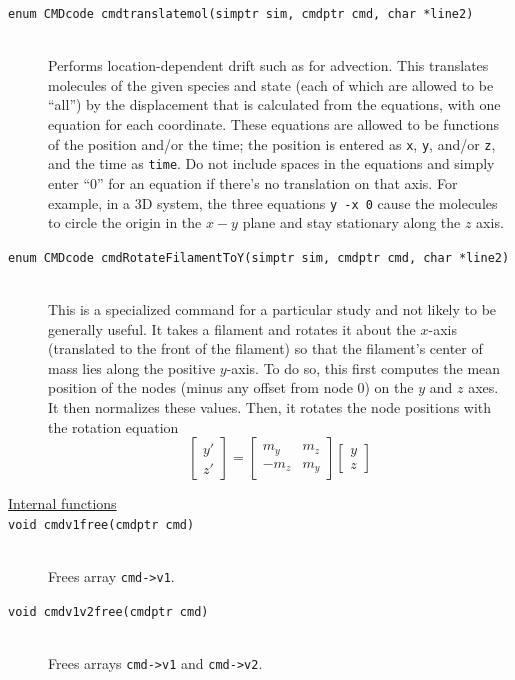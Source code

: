 \documentclass {scrbook}
\newcommand {\ttt} {\texttt}
\begin{document}
\begin{description}
\item[\ttt{enum CMDcode cmdtranslatemol(simptr sim, cmdptr cmd, char *line2)}]
\hfill \\
Performs location-dependent drift such as for advection. This translates molecules of the given species and state (each of which are allowed to be ``all'') by the displacement that is calculated from the equations, with one equation for each coordinate. These equations are allowed to be functions of the position and/or the time; the position is entered as \ttt{x}, \ttt{y}, and/or \ttt{z}, and the time as \ttt{time}. Do not include spaces in the equations and simply enter ``0'' for an equation if there's no translation on that axis. For example, in a 3D system, the three equations \ttt{y -x 0} cause the molecules to circle the origin in the $x-y$ plane and stay stationary along the $z$ axis.

\item[\ttt{enum CMDcode cmdRotateFilamentToY(simptr sim, cmdptr cmd, char *line2)}]
\hfill \\
This is a specialized command for a particular study and not likely to be generally useful. It takes a filament and rotates it about the $x$-axis (translated to the front of the filament) so that the filament's center of mass lies along the positive $y$-axis. To do so, this first computes the mean position of the nodes (minus any offset from node 0) on the $y$ and $z$ axes. It then normalizes these values. Then, it rotates the node positions with the rotation equation
$$\left[ \begin{array}{c} y' \\ z' \end{array} \right] = \left[ \begin{array}{cc} m_y & m_z \\ -m_z & m_y \end{array} \right] \left[ \begin{array}{c} y \\ z \end{array} \right]$$


\item[\underline{Internal functions}]

\item[\ttt{void cmdv1free(cmdptr cmd)}]
\hfill \\
Frees array \ttt{cmd->v1}.

\item[\ttt{void cmdv1v2free(cmdptr cmd)}]
\hfill \\
Frees arrays \ttt{cmd->v1} and \ttt{cmd->v2}.


\end{description}
\end{document}
